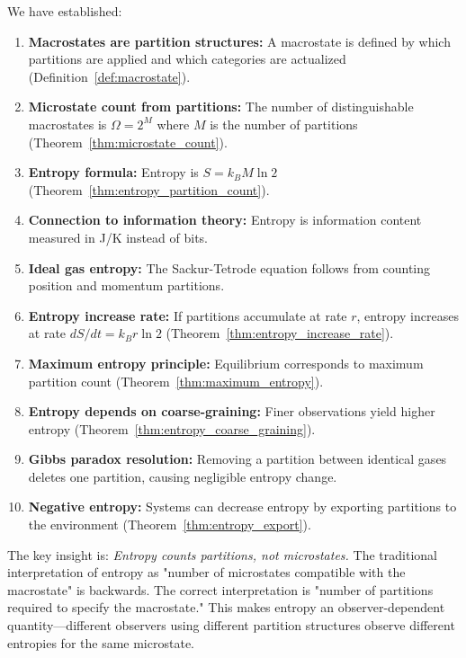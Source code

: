 \documentclass[twocolumn,10pt]{article}
\theoremstyle{definition}
\theoremstyle{remark}
\begin{document}
We have established:

\begin{enumerate}
\item \textbf{Macrostates are partition structures:} A macrostate is defined by which partitions are applied and which categories are actualized (Definition~\ref{def:macrostate}).

\item \textbf{Microstate count from partitions:} The number of distinguishable macrostates is $\Omega = 2^M$ where $M$ is the number of partitions (Theorem~\ref{thm:microstate_count}).

\item \textbf{Entropy formula:} Entropy is $S = k_B M \ln 2$ (Theorem~\ref{thm:entropy_partition_count}).

\item \textbf{Connection to information theory:} Entropy is information content measured in J/K instead of bits.

\item \textbf{Ideal gas entropy:} The Sackur-Tetrode equation follows from counting position and momentum partitions.

\item \textbf{Entropy increase rate:} If partitions accumulate at rate $r$, entropy increases at rate $dS/dt = k_B r \ln 2$ (Theorem~\ref{thm:entropy_increase_rate}).

\item \textbf{Maximum entropy principle:} Equilibrium corresponds to maximum partition count (Theorem~\ref{thm:maximum_entropy}).

\item \textbf{Entropy depends on coarse-graining:} Finer observations yield higher entropy (Theorem~\ref{thm:entropy_coarse_graining}).

\item \textbf{Gibbs paradox resolution:} Removing a partition between identical gases deletes one partition, causing negligible entropy change.

\item \textbf{Negative entropy:} Systems can decrease entropy by exporting partitions to the environment (Theorem~\ref{thm:entropy_export}).
\end{enumerate}

\noindent The key insight is: \textit{Entropy counts partitions, not microstates.} The traditional interpretation of entropy as "number of microstates compatible with the macrostate" is backwards. The correct interpretation is "number of partitions required to specify the macrostate." This makes entropy an observer-dependent quantity—different observers using different partition structures observe different entropies for the same microstate.
\end{document}
